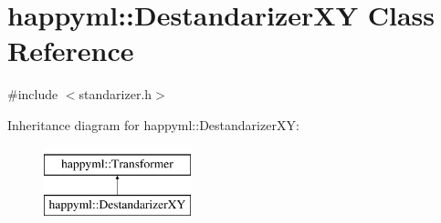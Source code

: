 \hypertarget{classhappyml_1_1DestandarizerXY}{}\section{happyml\+:\+:Destandarizer\+XY Class Reference}
\label{classhappyml_1_1DestandarizerXY}


{\ttfamily \#include $<$standarizer.\+h$>$}

Inheritance diagram for happyml\+:\+:Destandarizer\+XY\+:\begin{figure}[H]
\begin{center}
\leavevmode
\includegraphics[height=2.000000cm]{classhappyml_1_1DestandarizerXY}
\end{center}
\end{figure}
